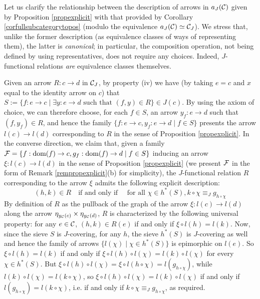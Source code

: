 \documentclass[a4paper,12pt]{article}
\begin{document}
\begin{remark}\label{remrelationstwoapproaches}
	Let us clarify the relationship between the description of arrows in $a_{J}({\cal C})$ given by Proposition \ref{propexplicit} with that provided by Corollary 	\ref{corfullsubcategorytopos} (modulo the equivalence $a_{J}({\cal C})\simeq {\cal C}_{J}$). We stress that, unlike the former description (as equivalence classes of ways of representing them), the latter is \emph{canonical}; in particular, the composition operation, not being defined by using representatives, does not require any choices. Indeed, $J$-functional relations \emph{are} equivalence classes themselves.
	
	Given an arrow $R:c\to d$ in ${\cal C}_{J}$, by property (iv) we have (by taking $e=c$ and $x$ equal to the identity arrow on $c$) that $S:=\{f:e\to c \mid \exists y:e\to d \text{ such that } (f, y)\in R \}\in J(c)$. By using the axiom of choice, we can therefore choose, for each $f\in S$, an arrow $y_{f}:e\to d$ such that $(f, y_{f})\in R$, and hence the family $\{f:e\to c, y_{f}:e\to d \mid f\in S\}$ presents the arrow $l(c)\to l(d)$ corresponding to $R$ in the sense of Proposition \ref{propexplicit}. In the converse direction, we claim that, given a family ${\cal F}=\{f:\textup{dom}(f)\to c, g_{f}:\textup{dom}(f) \to d \mid f\in S\}$ inducing an arrow $\xi:l(c)\to l(d)$ in the sense of Proposition \ref{propexplicit} (we present $\cal F$ in the form of Remark \ref{rempropexplicit}(b) for simplicity), the $J$-functional relation $R$ corresponding to the arrow $\xi$ admits the following explicit description:
	$$
	(h,k)\in R \quad\text{if and only if}\quad \text{ for all } \chi\in h^{\ast}(S), k\circ \chi\equiv_{J} g_{h\circ \chi}
	$$
	By definition of $R$ as the pullback of the graph of the arrow $\xi:l(c)\to l(d)$ along the arrow $\eta_{y_{\cal C}(c)}\times \eta_{y_{\cal C}(d)}$, $R$ is characterized by the following universal property: for any $e\in {\cal C}$, $(h,k)\in R(e)$ if and only if $\xi\circ l(h)=l(k)$. Now, since the sieve $S$ is $J$-covering, for any $h$, the sieve $h^{\ast}(S)$ is $J$-covering as well and hence the family of arrows $\{l(\chi) \mid \chi\in h^{\ast}(S)\}$ is epimorphic on $l(e)$. So $\xi\circ l(h)=l(k)$ if and only if $\xi\circ l(h)\circ l(\chi)=l(k)\circ l(\chi)$ for every $\chi\in h^{\ast}(S)$. But $\xi\circ l(h)\circ l(\chi)=\xi\circ l(h\circ \chi)=l(g_{h\circ \chi})$, while $l(k)\circ l(\chi)=l(k\circ \chi)$, so $\xi\circ l(h)\circ l(\chi)=l(k)\circ l(\chi)$ if and only if $l(g_{h\circ \chi})=l(k\circ \chi)$, i.e. if and only if $k\circ \chi\equiv_{J} g_{h\circ \chi}$, as required.   
\end{remark}
\end{document}

